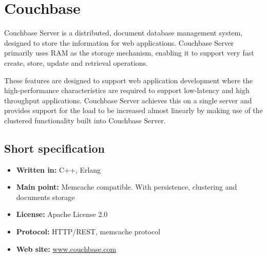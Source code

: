\chapter{Couchbase}

Couchbase Server is a distributed, document database management system, designed to store the information for web applications. Couchbase Server primarily uses RAM as the storage mechanism, enabling it to support very fast create, store, update and retrieval operations.

These features are designed to support web application development where the high-performance characteristics are required to support low-latency and high throughput applications. Couchbase Server achieves this on a single server and provides support for the load to be increased almost linearly by making use of the clustered functionality built into Couchbase Server.

\section{Short specification}

\begin{itemize}
  \item \textbf{Written in:} C++, Erlang
  \item \textbf{Main point:} Memcache compatible. With persistence, clustering and documents storage
  \item \textbf{License:} Apache License 2.0
  \item \textbf{Protocol:} HTTP/REST, memcache protocol
  \item \textbf{Web site:} \href{http://www.couchbase.com/}{www.couchbase.com}
\end{itemize}

